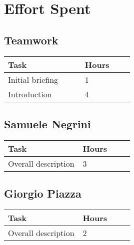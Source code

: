 \chapter{Effort Spent}

\section{Teamwork}
\vspace{2mm}
\begin{center}
    \begin{tabular}{@{}p{0.3\linewidth} p{0.2\linewidth}@{}}
        \hline
        \textbf{Task} & \textbf{Hours} \\ \hline
        Initial briefing & 1 \\ \hline
        Introduction & 4 \\ \hline
    \end{tabular}
\end{center}

\section{Samuele Negrini}
\vspace{2mm}
\begin{center}
	\begin{tabular}{@{}p{0.3\linewidth} p{0.2\linewidth}@{}}
		\hline
		\textbf{Task} & \textbf{Hours} \\ \hline
		Overall description & 3 \\ \hline
	\end{tabular}
\end{center}

\section{Giorgio Piazza}
\vspace{2mm}
\begin{center}
	\begin{tabular}{@{}p{0.3\linewidth} p{0.2\linewidth}@{}}
		\hline
		\textbf{Task} & \textbf{Hours} \\ \hline
		Overall description & 2 \\ \hline
	\end{tabular}
\end{center}